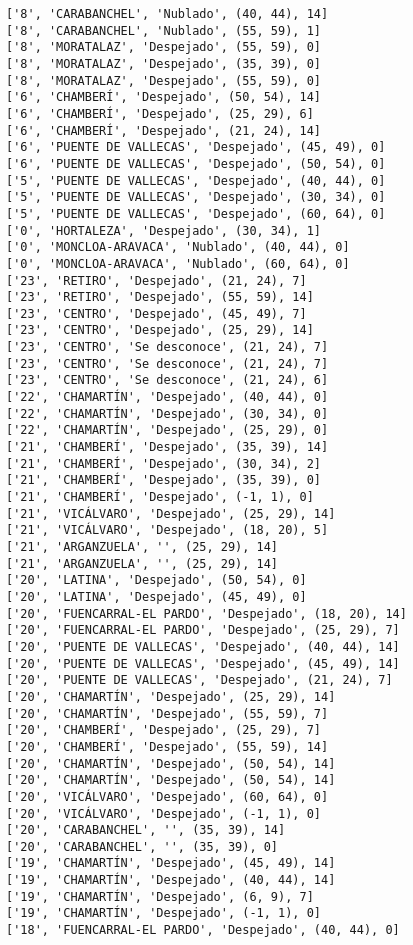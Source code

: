 \documentclass[11pt]{article}
\begin{document}
\begin{Verbatim}[commandchars=\\\{\}]
['8', 'CARABANCHEL', 'Nublado', (40, 44), 14]
['8', 'CARABANCHEL', 'Nublado', (55, 59), 1]
['8', 'MORATALAZ', 'Despejado', (55, 59), 0]
['8', 'MORATALAZ', 'Despejado', (35, 39), 0]
['8', 'MORATALAZ', 'Despejado', (55, 59), 0]
['6', 'CHAMBERÍ', 'Despejado', (50, 54), 14]
['6', 'CHAMBERÍ', 'Despejado', (25, 29), 6]
['6', 'CHAMBERÍ', 'Despejado', (21, 24), 14]
['6', 'PUENTE DE VALLECAS', 'Despejado', (45, 49), 0]
['6', 'PUENTE DE VALLECAS', 'Despejado', (50, 54), 0]
['5', 'PUENTE DE VALLECAS', 'Despejado', (40, 44), 0]
['5', 'PUENTE DE VALLECAS', 'Despejado', (30, 34), 0]
['5', 'PUENTE DE VALLECAS', 'Despejado', (60, 64), 0]
['0', 'HORTALEZA', 'Despejado', (30, 34), 1]
['0', 'MONCLOA-ARAVACA', 'Nublado', (40, 44), 0]
['0', 'MONCLOA-ARAVACA', 'Nublado', (60, 64), 0]
['23', 'RETIRO', 'Despejado', (21, 24), 7]
['23', 'RETIRO', 'Despejado', (55, 59), 14]
['23', 'CENTRO', 'Despejado', (45, 49), 7]
['23', 'CENTRO', 'Despejado', (25, 29), 14]
['23', 'CENTRO', 'Se desconoce', (21, 24), 7]
['23', 'CENTRO', 'Se desconoce', (21, 24), 7]
['23', 'CENTRO', 'Se desconoce', (21, 24), 6]
['22', 'CHAMARTÍN', 'Despejado', (40, 44), 0]
['22', 'CHAMARTÍN', 'Despejado', (30, 34), 0]
['22', 'CHAMARTÍN', 'Despejado', (25, 29), 0]
['21', 'CHAMBERÍ', 'Despejado', (35, 39), 14]
['21', 'CHAMBERÍ', 'Despejado', (30, 34), 2]
['21', 'CHAMBERÍ', 'Despejado', (35, 39), 0]
['21', 'CHAMBERÍ', 'Despejado', (-1, 1), 0]
['21', 'VICÁLVARO', 'Despejado', (25, 29), 14]
['21', 'VICÁLVARO', 'Despejado', (18, 20), 5]
['21', 'ARGANZUELA', '', (25, 29), 14]
['21', 'ARGANZUELA', '', (25, 29), 14]
['20', 'LATINA', 'Despejado', (50, 54), 0]
['20', 'LATINA', 'Despejado', (45, 49), 0]
['20', 'FUENCARRAL-EL PARDO', 'Despejado', (18, 20), 14]
['20', 'FUENCARRAL-EL PARDO', 'Despejado', (25, 29), 7]
['20', 'PUENTE DE VALLECAS', 'Despejado', (40, 44), 14]
['20', 'PUENTE DE VALLECAS', 'Despejado', (45, 49), 14]
['20', 'PUENTE DE VALLECAS', 'Despejado', (21, 24), 7]
['20', 'CHAMARTÍN', 'Despejado', (25, 29), 14]
['20', 'CHAMARTÍN', 'Despejado', (55, 59), 7]
['20', 'CHAMBERÍ', 'Despejado', (25, 29), 7]
['20', 'CHAMBERÍ', 'Despejado', (55, 59), 14]
['20', 'CHAMARTÍN', 'Despejado', (50, 54), 14]
['20', 'CHAMARTÍN', 'Despejado', (50, 54), 14]
['20', 'VICÁLVARO', 'Despejado', (60, 64), 0]
['20', 'VICÁLVARO', 'Despejado', (-1, 1), 0]
['20', 'CARABANCHEL', '', (35, 39), 14]
['20', 'CARABANCHEL', '', (35, 39), 0]
['19', 'CHAMARTÍN', 'Despejado', (45, 49), 14]
['19', 'CHAMARTÍN', 'Despejado', (40, 44), 14]
['19', 'CHAMARTÍN', 'Despejado', (6, 9), 7]
['19', 'CHAMARTÍN', 'Despejado', (-1, 1), 0]
['18', 'FUENCARRAL-EL PARDO', 'Despejado', (40, 44), 0]

\end{Verbatim}
\end{document}
